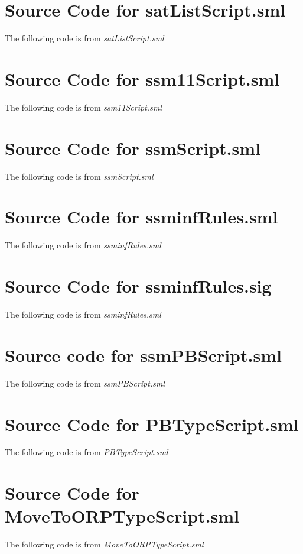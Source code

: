 \chapter{Source Code for satListScript.sml}
\label{cha:source-code-satl}
The following code is from \emph{satListScript.sml}


\chapter{Source Code for ssm11Script.sml}
\label{cha:source-code-ssm11scr}
The following code is from \emph{ssm11Script.sml}


\chapter{Source Code for ssmScript.sml}
\label{cha:source-code-ssmscr}
The following code is from \emph{ssmScript.sml}


\chapter{Source Code for ssminfRules.sml}
\label{cha:source-code-ssminfr}
The following code is from \emph{ssminfRules.sml}


\chapter{Source Code for ssminfRules.sig}
\label{cha:source-code-ssminfr-1}
The following code is from \emph{ssminfRules.sml}


\chapter{Source code for ssmPBScript.sml}
\label{cha:source-code-ssmpbscr}
The following code is from \emph{ssmPBScript.sml}


\chapter{Source Code for PBTypeScript.sml}
\label{cha:source-code-pbtyp}
The following code is from \emph{PBTypeScript.sml}


\chapter{Source Code for MoveToORPTypeScript.sml}
\label{cha:source-code-movet}
The following code is from \emph{MoveToORPTypeScript.sml}


